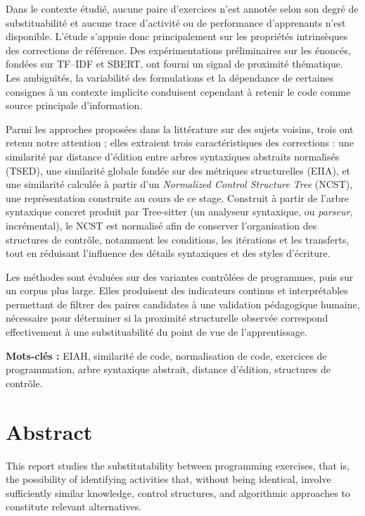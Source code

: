 \documentclass[12pt,a4paper,oneside]{report}
\begin{document}
Dans le contexte étudié, aucune paire d'exercices n'est annotée selon son
degré de substituabilité et aucune trace d'activité ou de performance
d'apprenants n'est disponible. L'étude s'appuie donc principalement sur
les propriétés intrinsèques des corrections de référence. Des
expérimentations préliminaires sur les énoncés, fondées sur TF--IDF et
SBERT, ont fourni un signal de proximité thématique. Les ambiguïtés, la
variabilité des formulations et la dépendance de certaines consignes à un
contexte implicite conduisent cependant à retenir le code comme source
principale d'information.

Parmi les approches proposées dans la littérature sur des sujets voisins,
trois ont retenu notre attention ; elles extraient trois caractéristiques
des corrections : une
similarité par distance d'édition entre arbres syntaxiques abstraits
normalisés (TSED), une similarité globale fondée sur des métriques
structurelles (EIIA), et une similarité calculée à partir d'un
\emph{Normalized Control Structure Tree} (NCST), une représentation construite
au cours de ce stage. Construit à partir de
l'arbre syntaxique concret produit par Tree-sitter (un analyseur syntaxique,
ou \emph{parseur}, incrémental), le NCST est normalisé
afin de conserver l'organisation des structures de contrôle, notamment les
conditions, les itérations et les transferts, tout en réduisant
l'influence des détails syntaxiques et des styles d'écriture.

Les méthodes sont évaluées sur des variantes contrôlées de programmes,
puis sur un corpus plus large. Elles produisent des indicateurs continus et
interprétables permettant de filtrer des paires candidates à une validation
pédagogique humaine, nécessaire pour déterminer si la proximité structurelle
observée correspond effectivement à une substituabilité du point de vue de
l'apprentissage.

\vspace{2\baselineskip}
\noindent\textbf{Mots-clés :} EIAH, similarité de code, normalisation de code,
exercices de programmation, arbre syntaxique abstrait, distance d'édition,
structures de contrôle.

\chapter*{Abstract}
This report studies the substitutability between programming exercises, that is, the
 possibility of identifying activities that, without being identical, involve sufficiently similar
  knowledge, control structures, and algorithmic approaches to constitute relevant alternatives.
\end{document}
